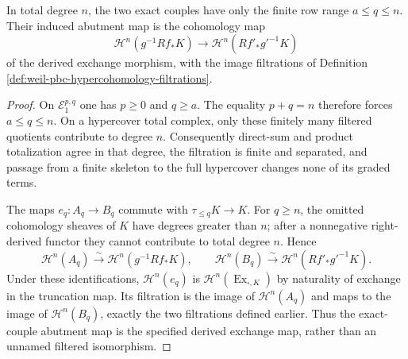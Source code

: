 \begin{lemma}
\label{lemma:weil-pbc-exact-couple-abutment}
In total degree $n$, the two exact couples have only the finite row range
$a\leq q\leq n$.  Their induced abutment map is the cohomology map
\[
\mathcal H^n(g^{-1}Rf_*K)\longrightarrow
\mathcal H^n(Rf'_*g'^{-1}K)
\]
of the derived exchange morphism, with the image filtrations of Definition
\ref{def:weil-pbc-hypercohomology-filtrations}.
\end{lemma}
\begin{proof}

On $\mathcal E_1^{p,q}$ one has $p\geq0$ and $q\geq a$.  The equality
$p+q=n$ therefore forces $a\leq q\leq n$.  On a hypercover total complex,
only these finitely many filtered quotients contribute to degree $n$.
Consequently direct-sum and product totalization agree in that degree, the
filtration is finite and separated, and passage from a finite skeleton to
the full hypercover changes none of its graded terms.

The maps $e_q:A_q\to B_q$ commute with
$\tau_{\leq q}K\to K$.  For $q\geq n$, the omitted cohomology sheaves of
$K$ have degrees greater than $n$; after a nonnegative right-derived
functor they cannot contribute to total degree $n$.  Hence
\[
\mathcal H^n(A_q)\xrightarrow{\sim}
\mathcal H^n(g^{-1}Rf_*K),\qquad
\mathcal H^n(B_q)\xrightarrow{\sim}
\mathcal H^n(Rf'_*g'^{-1}K).
\]
Under these identifications, $\mathcal H^n(e_q)$ is
$\mathcal H^n(\operatorname{Ex}_{\square,K})$ by naturality of exchange in
the truncation map.  Its filtration is the image of
$\mathcal H^n(A_q)$ and maps to the image of $\mathcal H^n(B_q)$, exactly
the two filtrations defined earlier.  Thus the exact-couple abutment map is
the specified derived exchange map, rather than an unnamed filtered
isomorphism.
\end{proof}

